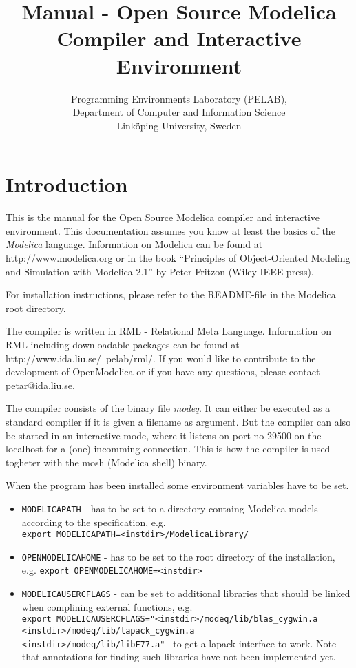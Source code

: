 \documentclass{report}
\title{Manual - Open Source Modelica Compiler and Interactive Environment}
\author{Programming Environments Laboratory (PELAB), \\ Department of Computer and Information Science \\ Link\"{o}ping University, Sweden}
\begin{document}
\maketitle
\chapter{Introduction}
This is the manual for the Open Source Modelica compiler and
interactive environment. This documentation assumes you know at least
the basics of the \emph{Modelica} language. Information on Modelica
can be found at http://www.modelica.org or in the book
``Principles of Object-Oriented Modeling and Simulation with Modelica
2.1'' by Peter Fritzon (Wiley IEEE-press).

For installation instructions, please refer to the README-file in the
Modelica root directory.

The compiler is written in RML - Relational Meta Language. Information
on RML including downloadable packages can be found at
http://www.ida.liu.se/~pelab/rml/. If you would like to
contribute to the development of OpenModelica or if you have any
questions, please contact petar@ida.liu.se.

The compiler consists of the binary file \emph{modeq}. It can either
be executed as a standard compiler if it is given a filename as
argument. But the compiler can also be started in an interactive mode,
where it listens on port no 29500 on the localhost for a (one)
incomming connection. This is how the compiler is used togheter with
the mosh (Modelica shell) binary.

When the program has been installed some environment variables have to
be set.
\begin{itemize}
\item{{\tt MODELICAPATH}} - has to be set to a directory containg Modelica
models according to the specification, e.g.  \\ {\tt export
MODELICAPATH=<instdir>/ModelicaLibrary/ }
\item{{\tt OPENMODELICAHOME}} - has to be set to the root directory of the
installation, e.g. {\tt export
OPENMODELICAHOME=<instdir> } 
\item{{\tt MODELICAUSERCFLAGS}} - can be set to additional libraries
that should be linked when complining external functions, e.g. \\
{\tt export MODELICAUSERCFLAGS="<instdir>/modeq/lib/blas\_cygwin.a \\
<instdir>/modeq/lib/lapack\_cygwin.a  \\
<instdir>/modeq/lib/libF77.a" } to
get a lapack interface to work. Note that annotations for finding such
libraries have not been implemented yet.
\end{itemize}
\end{document}
